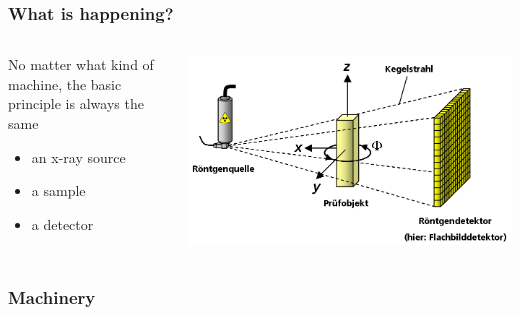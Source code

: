 \begin{frame}
	\frametitle{What is happening?}
	\begin{columns}%
		\begin{column}{0.45\linewidth}%
			No matter what kind of machine, the basic principle is always the same
			\begin{itemize}
				\item an x-ray source
				\item a sample
				\item a detector
			\end{itemize}
		\end{column}%
		\begin{column}{0.45\linewidth}%
			\centering%
			\includegraphics[width=\imagewidth]{./images/3D_Computed_Tomography}%
		\end{column}%
	\end{columns}%
\end{frame}

\begin{frame}
	\frametitle{Machinery}
	\begin{columns}
		\begin{column}{0.49\linewidth}
			\centering
			
		\end{column}
		\begin{column}{0.49\linewidth}
			\centering
			\only<1>{}%
			\only<2|handout:0>{}%
			\only<3|handout:0>{}%
		\end{column}
	\end{columns}
\end{frame}


